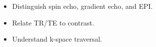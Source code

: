 \begin{objectives}
\begin{itemize}[leftmargin=1.4em,itemsep=2pt]
\item Distinguish spin echo, gradient echo, and EPI.
\item Relate TR/TE to contrast.
\item Understand k-space traversal.
\end{itemize}
\end{objectives}
